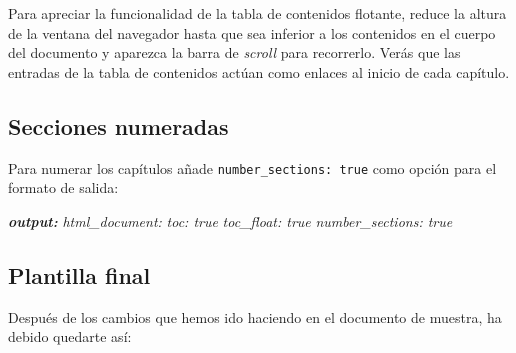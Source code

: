 \documentclass[
  title=normal,
  notoc,
  bib=normal]{mnye}
\newenvironment{Shaded}{\begin{snugshade}}{\end{snugshade}}
\newcommand{\AnnotationTok}[1]{\textcolor[rgb]{0.56,0.35,0.01}{\textbf{\textit{#1}}}}
\newcommand{\CommentTok}[1]{\textcolor[rgb]{0.56,0.35,0.01}{\textit{#1}}}
\newcommand{\FunctionTok}[1]{\textcolor[rgb]{0.00,0.00,0.00}{#1}}
\newcommand{\InformationTok}[1]{\textcolor[rgb]{0.56,0.35,0.01}{\textbf{\textit{#1}}}}
\begin{document}
Para apreciar la funcionalidad de la tabla de contenidos flotante, reduce la altura de la ventana del navegador hasta que sea inferior a los contenidos en el cuerpo del documento y aparezca la barra de \emph{scroll} para recorrerlo. Verás que las entradas de la tabla de contenidos actúan como enlaces al inicio de cada capítulo.

\hypertarget{secciones-numeradas}{%
\subsection{Secciones numeradas}\label{secciones-numeradas}}

Para numerar los capítulos añade \texttt{number\_sections:\ true} como opción para el formato de salida:

\begin{Shaded}
\begin{Highlighting}[]
\AnnotationTok{output:}\CommentTok{ }
\CommentTok{    html\_document:}
\CommentTok{        toc: true}
\CommentTok{        toc\_float: true}
\CommentTok{        number\_sections: true}
\end{Highlighting}
\end{Shaded}

\hypertarget{plantilla-final}{%
\subsection{Plantilla final}\label{plantilla-final}}

Después de los cambios que hemos ido haciendo en el documento de muestra, ha debido quedarte así:

\begin{Shaded}
\end{Shaded}
\end{document}
